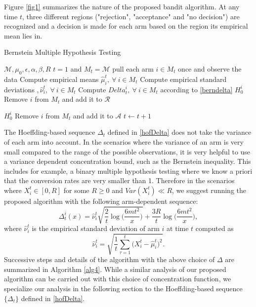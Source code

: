\documentclass[12pt]{article}
\def\MM{\mathcal{M}}
\def\RR{\mathcal{R}}
\def\AA{\mathcal{A}}
\begin{document}
Figure \ref{fig1}  summarizes the nature of the proposed bandit algorithm. At any time $t$, three different regions ("rejection", "acceptance" and "no decision") are recognized and a decision is made for each arm based on the region its empirical mean lies in. 

\begin{algorithm}[tb]
   \caption{Bernstein Multiple Hypothesis Testing}
   \label{alg4}
\begin{algorithmic}
    $\MM,\mu_0,\epsilon,\alpha,\beta,R$
    $t=1$ and $M_t = \MM$
   \STATE pull each arm $i\in M_t$ once and observe the data
   \STATE Compute empirical means $\hat\mu^t_i,~\forall~i\in M_t$
   \STATE Compute empirical standard deviations $,\hat\nu^t_i,~\forall~i\in M_t$
   \STATE Compute $Delta^i_t,~\forall~i\in M_t$ according to \eqref{berndelta}
  		 $H_0^i$
  		\STATE Remove $i$ from $M_t$ and add it to $\RR$
  	\ENDIF
  	
  		 $H_0^i$
  		\STATE Remove $i$ from $M_t$ and add it to $\AA$
  	\ENDIF
  \ENDFOR
  \STATE $t \leftarrow t+1$
   \ENDWHILE
   
\end{algorithmic}
\end{algorithm} 


The  Hoeffding-based sequence $\Delta_t$ defined in \eqref{hofDelta} does not take the variance of each arm into account. In the scenarios where the variance of an arm is very small compared to the range of the possible observations, it is very helpful to use a variance dependent concentration bound, such as the Bernstein inequality. This includes for example, a binary multiple hypothesis testing where we know a priori that the conversion rates are very smaller than 1. Therefore in the scenarios where $X_i^t\in[0,R]$ for some $R\geq 0$ and $Var(X_i^t)\ll R$, we suggest running the proposed algorithm with the following arm-dependent sequence:
\begin{equation}
\label{berndelta}
\Delta_t^i(x) = \hat\nu_i^t\sqrt{\frac{2}{t}\log\Big(\frac{6mt^2}{x}\Big)} + \frac{3R}{t}\log\Big(\frac{6mt^2}{x}\Big),
\end{equation}
where $\hat\nu^t_i$ is the empirical standard deviation of arm $i$ at time $t$ computed as 
\begin{equation}
\label{nu1}
\hat\nu^t_i = \sqrt{\frac{1}{t}\sum_{\tau = 1}^t\big(X^t_i - \hat\mu_i^t\big)^2}.
\end{equation}
Successive steps and details of the algorithm with the above choice of $\Delta$ are summarized in Algorithm \ref{alg4}. While a similar analysis of our proposed algorithm can be carried out with this choice of concentration function, we specialize our analysis in the following section to the Hoeffding-based sequence $\{\Delta_t\}$ defined in \eqref{hofDelta}.
\end{document}
